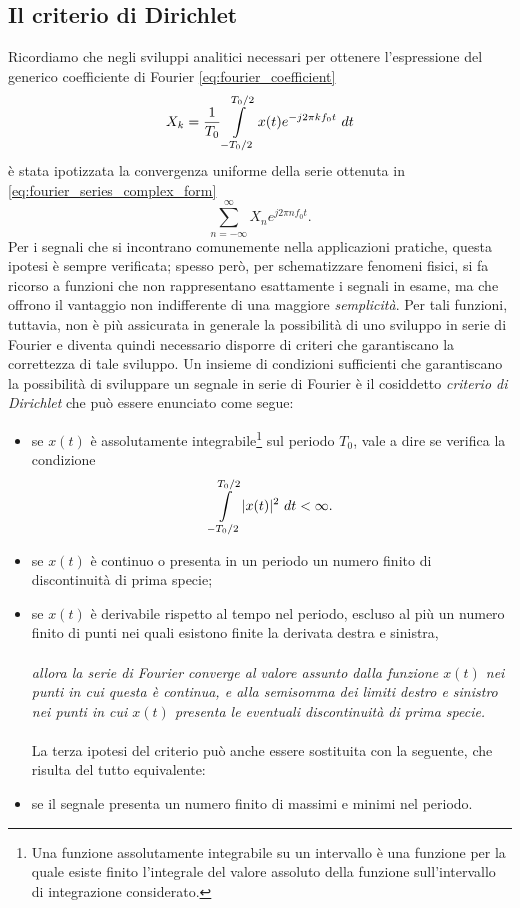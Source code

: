 \documentclass[12pt,oneside,openany]{memoir}
\numberwithin{equation}{subsection}
\DeclarePairedDelimiter{\abs}{\lvert}{\rvert}
\newcommand{\dt}{\ dt}
\begin{document}
\subsection{Il criterio di Dirichlet}
Ricordiamo che negli sviluppi analitici necessari per ottenere l'espressione del generico coefficiente di Fourier \eqref{eq:fourier_coefficient}
\begin{equation}
	X_k = \frac{1}{T_0} \int\displaylimits_{-T_0/2}^{T_0/2} x(t) e^{-j 2 \pi k f_0 t} \dt
\end{equation}
\`e stata ipotizzata la convergenza uniforme della serie ottenuta in \eqref{eq:fourier_series_complex_form}
\begin{equation}
	\sum_{n = -\infty}^{\infty} X_n e^{j 2 \pi n f_0 t}.
\end{equation}
Per i segnali che si incontrano comunemente nella applicazioni pratiche, questa ipotesi \`e sempre verificata; spesso per\`o, per schematizzare fenomeni fisici, si fa ricorso a funzioni che non rappresentano esattamente i segnali in esame, ma che offrono il vantaggio non indifferente di una maggiore \textit{semplicit\`a}. Per tali funzioni, tuttavia, non \`e pi\`u assicurata in generale la possibilit\`a di uno sviluppo in serie di Fourier e diventa quindi necessario disporre di criteri che garantiscano la correttezza di tale sviluppo.
\bigbreak
Un insieme di condizioni sufficienti che garantiscano la possibilit\`a di sviluppare un segnale in serie di Fourier \`e il cosiddetto \textit{criterio di Dirichlet} che pu\`o essere enunciato come segue:
\begin{itemize}
	\item se $x(t)$ \`e assolutamente integrabile\footnote{Una funzione assolutamente integrabile su un intervallo \`e una funzione per la quale esiste finito l'integrale del valore assoluto della funzione sull'intervallo di integrazione considerato.} sul periodo $T_0$, vale a dire se verifica la condizione
		\begin{equation}
			\int\displaylimits_{-T_0/2}^{T_0/2} \abs{x(t)}^2 \dt < \infty.
		\end{equation}
	\item se $x(t)$ \`e continuo o presenta in un periodo un numero finito di discontinuit\`a di prima specie;
	\item se $x(t)$ \`e derivabile rispetto al tempo nel periodo, escluso al pi\`u un numero finito di punti nei quali esistono finite la derivata destra e sinistra,\\
	\\
	\textit{allora la serie di Fourier converge al valore assunto dalla funzione $x(t)$ nei punti in cui questa \`e continua, e alla semisomma dei limiti destro e sinistro nei punti in cui $x(t)$ presenta le eventuali discontinuit\`a di prima specie.}\\
	\\	
	La terza ipotesi del criterio pu\`o anche essere sostituita con la seguente, che risulta del tutto equivalente:
	\item se il segnale presenta un numero finito di massimi e minimi nel periodo.
\end{itemize}
\end{document}
